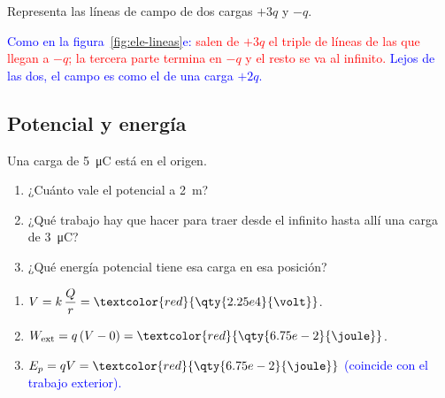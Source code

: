 \begin{exercise}
    Representa las líneas de campo de dos cargas \(+3q\) y \(-q\).
    \begin{solu}
        \textcolor{blue}{Como en la figura~\ref{fig:ele-lineas}e:} \textcolor{red}{salen de \(+3q\) el triple de líneas de las que llegan a \(-q\); la tercera
        parte termina en \(-q\) y el resto se va al infinito.} \textcolor{blue}{Lejos de las dos, el campo es como el de una carga \(+2q\).}
    \end{solu}
\end{exercise}

\subsection{Potencial y energía}

\begin{exercise}
    Una carga de \qty{5}{\micro\coulomb} está en el origen.
    \begin{enumerate}[label=\letraminuscula]
        \item ¿Cuánto vale el potencial a \qty{2}{\m}?
        \item ¿Qué trabajo hay que hacer para traer desde el infinito hasta allí una carga de \qty{3}{\micro\coulomb}?
        \item ¿Qué energía potencial tiene esa carga en esa posición?
    \end{enumerate}
    \begin{solu}
        \begin{enumerate}[label=\letraminuscula]
            \item \(V = k\,\dfrac{Q}{r} = \textcolor{red}{\qty{2.25e4}{\volt}}\).
            \item \(W_{\text{ext}} = q\,(V - 0) = \textcolor{red}{\qty{6.75e-2}{\joule}}\).
            \item \(E_p = qV = \textcolor{red}{\qty{6.75e-2}{\joule}}\) \textcolor{blue}{(coincide con el trabajo exterior).}
        \end{enumerate}
    \end{solu}
\end{exercise}

